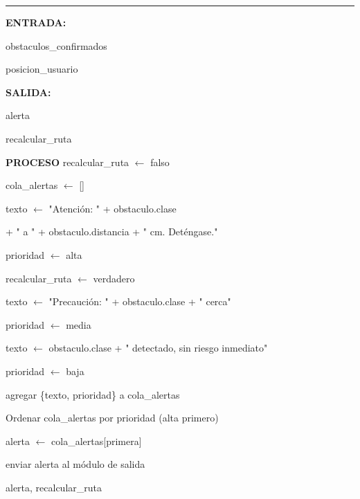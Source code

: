 \begin{center}
\label{alg:alertaobs}
\end{center}
\vspace{-1.8cm}
\rule{\textwidth}{0.4pt}
\vspace{-0.9cm}

\begin{algorithmic}[1]

\Statex \textbf{ENTRADA:}

\Statex obstaculos\_confirmados

\Statex posicion\_usuario

\Statex
\Statex \textbf{SALIDA:}

\Statex alerta

\Statex recalcular\_ruta

\Statex
\Statex \textbf{PROCESO}
\State recalcular\_ruta $\gets$ falso

\State cola\_alertas $\gets$ []

\Statex
{}


        \State texto $\gets$
        "Atención: " + obstaculo.clase

        \Statex \hspace{1.3cm}
        + " a " + obstaculo.distancia + " cm. Deténgase."

        \State prioridad $\gets$ alta

        \State recalcular\_ruta $\gets$ verdadero


        \State texto $\gets$
        "Precaución: " + obstaculo.clase + " cerca"

        \State prioridad $\gets$ media

    \Else

        \State texto $\gets$
        obstaculo.clase + " detectado, sin riesgo inmediato"

        \State prioridad $\gets$ baja

    \EndIf

    \Statex

    \State agregar \{texto, prioridad\}
    \Statex \hspace{1.3cm} a cola\_alertas

\EndFor

\Statex
\State Ordenar cola\_alertas por prioridad (alta primero)

\Statex
{}

    \State alerta $\gets$
    cola\_alertas[primera]

    \State enviar alerta al módulo de salida

\EndIf

\Statex
\State \Return alerta, recalcular\_ruta

\end{algorithmic}
